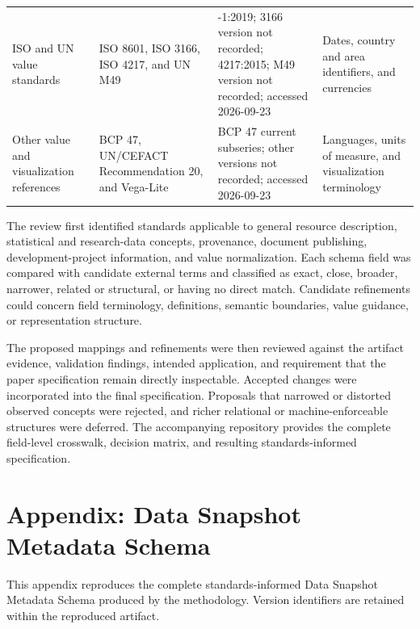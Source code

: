 \documentclass{article}
\begin{document}
\begin{table}[!ht]
\begin{tabularx}{\textwidth}{>{\RaggedRight\arraybackslash}p{} >{\RaggedRight\arraybackslash}p{} >{\RaggedRight\arraybackslash}p{} >{\RaggedRight\arraybackslash}X}
        ISO and UN value standards & ISO 8601, ISO 3166, ISO 4217, and UN M49~\citep{iso8601,iso3166,iso4217,unm49} & 8601-1:2019; 3166 version not recorded; 4217:2015; M49 version not recorded; accessed 2026-09-23 & Dates, country and area identifiers, and currencies \\
        Other value and visualization references & BCP 47, UN/CEFACT Recommendation 20, and Vega-Lite~\citep{ietf2009bcp47,uncefactrec20,vegalite2026} & BCP 47 current subseries; other versions not recorded; accessed 2026-09-23 & Languages, units of measure, and visualization terminology \\
        \bottomrule
    \end{tabularx}
\end{table}

The review first identified standards applicable to general resource description, statistical and research-data concepts, provenance, document publishing, development-project information, and value normalization. Each schema field was compared with candidate external terms and classified as exact, close, broader, narrower, related or structural, or having no direct match. Candidate refinements could concern field terminology, definitions, semantic boundaries, value guidance, or representation structure.

The proposed mappings and refinements were then reviewed against the artifact evidence, validation findings, intended application, and requirement that the paper specification remain directly inspectable. Accepted changes were incorporated into the final specification. Proposals that narrowed or distorted observed concepts were rejected, and richer relational or machine-enforceable structures were deferred. The accompanying repository provides the complete field-level crosswalk, decision matrix, and resulting standards-informed specification.

\section{Appendix: Data Snapshot Metadata Schema}
\label{appendix:schema}

This appendix reproduces the complete standards-informed Data Snapshot Metadata Schema produced by the methodology. Version identifiers are retained within the reproduced artifact.
\end{document}

